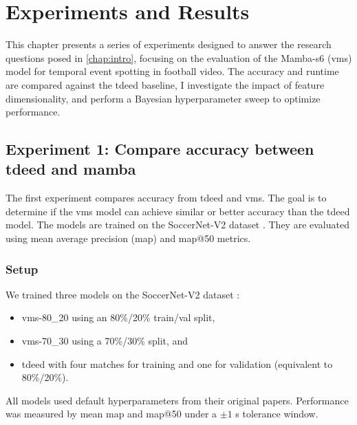 \chapter{Experiments and Results}
\label{chap:experiments}
This chapter presents a series of experiments designed to answer the research questions posed in \autoref{chap:intro}, focusing on the evaluation of the Mamba-\acrshort{s6} (\acrshort{vms}) model for temporal event spotting in football video. The accuracy and runtime are compared against the \acrshort{tdeed} baseline, I investigate the impact of feature dimensionality, and perform a Bayesian hyperparameter sweep to optimize performance.


\section{Experiment 1: Compare accuracy between \acrshort{tdeed} and mamba}
\label{sec:experiment1}
The first experiment compares accuracy from \acrfull{tdeed} and \acrfull{vms}. The goal is to determine if the \acrshort{vms} model can achieve similar or better accuracy than the \acrshort{tdeed} model. The models are trained on the SoccerNet-V2 dataset \cite{deliege_soccernet-v2_dataset_2021}. They are evaluated using mean average precision (\acrshort{map}) and \acrshort{map}@50 metrics.

\subsection{Setup}
\label{ssec:ex1_setup}
We trained three models on the SoccerNet-V2 dataset \cite{deliege_soccernet-v2_dataset_2021}:  
\begin{itemize}
    \item \acrshort{vms}-80\_20 using an 80\%/20\% train/val split,  
    \item \acrshort{vms}-70\_30 using a 70\%/30\% split, and  
    \item \acrshort{tdeed} with four matches for training and one for validation (equivalent to 80\%/20\%).  
\end{itemize}

All models used default hyperparameters from their original papers. Performance was measured by mean \acrfull{map} and \acrshort{map}@50 under a \(\pm 1\) s tolerance window.


